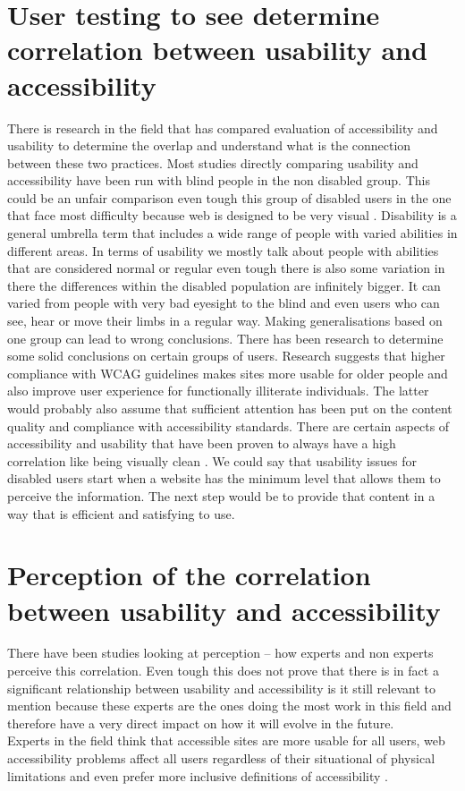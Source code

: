 \documentclass{thesis_proposal}
\begin{document}
\section{User testing to see determine correlation between usability and accessibility}
There is research in the field that has compared evaluation of accessibility and usability \citep{onay_durdu_perception_2020, aizpurua_exploring_2016, petrie_relationship_2007} to determine the overlap and understand what is the connection between these two practices.
Most studies directly comparing usability and accessibility have been run with blind people in the non disabled group. This could be an unfair comparison even tough this group of disabled users in the one that face most difficulty because web is designed to be very visual \citep{aizpurua_exploring_2016}.
Disability is a general umbrella term that includes a wide range of people with varied abilities in different areas. In terms of usability we mostly talk about people with abilities that are considered normal or regular even tough there is also some variation in there the differences within the disabled population are infinitely bigger. It can varied from people with very bad eyesight to the blind and even users who can see, hear or move their limbs in a  regular way. Making generalisations based on one group can lead to wrong conclusions. There has been research to determine some solid conclusions on certain groups of users. Research suggests that higher compliance with WCAG guidelines makes sites more usable for older people and also improve user experience for functionally illiterate individuals\citep{exploring_2018}. The latter would probably also assume that sufficient attention has been put on the content quality and compliance with accessibility standards.
There are certain aspects of accessibility and usability that have been proven to always have a high correlation like being visually clean \citep{exploring_2018}.
We could say that usability issues for disabled users start when a website has the minimum level that allows them to perceive the information. The next step would be to provide that content in a way that is efficient and satisfying to use.

\section{Perception of the correlation between usability and accessibility}
There have been studies looking at perception – how experts and non experts perceive this correlation. Even tough this does not prove that there is in fact a significant relationship between usability and accessibility is it still relevant to mention because these experts are the ones doing the most work in this field and therefore have a very direct impact on how it will evolve in the future.\\
Experts in the field think that accessible sites are more usable for all users, web accessibility problems affect all users regardless of their situational of physical limitations and even prefer more inclusive definitions of accessibility \citep{onay_durdu_perception_2020}.
\end{document}
